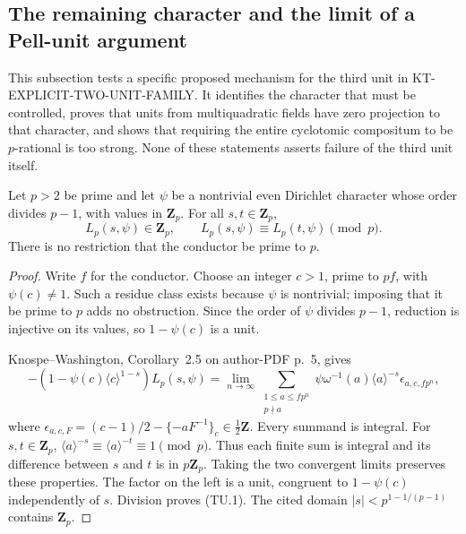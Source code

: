 \subsection{The remaining character and the limit of a Pell-unit argument}
\label{sec:kt-third-unit-character}

This subsection tests a specific proposed mechanism for the third unit in
KT-EXPLICIT-TWO-UNIT-FAMILY.  It identifies the character that must be
controlled, proves that units from multiquadratic fields have zero
projection to that character, and shows that requiring the entire
cyclotomic compositum to be $p$-rational is too strong.  None of these
statements asserts failure of the third unit itself.

\begin{lemma}
Let $p>2$ be prime and let $\psi$ be a nontrivial even Dirichlet
character whose order divides $p-1$, with values in $\mathbf Z_p$.
For all $s,t\in\mathbf Z_p$,
\[
 L_p(s,\psi)\in\mathbf Z_p,\qquad
 L_p(s,\psi)\equiv L_p(t,\psi)\pmod p.                 \tag{TU.1}
\]
There is no restriction that the conductor be prime to $p$.
\end{lemma}
\begin{proof}
Write $f$ for the conductor.  Choose an integer $c>1$, prime to $pf$,
with $\psi(c)\ne1$.  Such a residue class exists because $\psi$ is
nontrivial; imposing that it be prime to $p$ adds no obstruction.
Since the order of $\psi$ divides $p-1$, reduction is injective on its
values, so $1-\psi(c)$ is a unit.

Knospe--Washington, Corollary~2.5 on author-PDF p.~5, gives
\[
 -(1-\psi(c)\langle c\rangle^{1-s})L_p(s,\psi)
 =\lim_{n\to\infty}\sum_{\substack{1\le a\le fp^n\\p\nmid a}}
     \psi\omega^{-1}(a)\langle a\rangle^{-s}
     \epsilon_{a,c,fp^n},                                  \tag{TU.2}
\]
where
$\epsilon_{a,c,F}=(c-1)/2-\{-aF^{-1}\}_c\in\tfrac12\mathbf Z$.
Every summand is integral.  For $s,t\in\mathbf Z_p$,
$\langle a\rangle^{-s}\equiv\langle a\rangle^{-t}\equiv1\pmod p$.
Thus each finite sum is integral and its difference between $s$ and
$t$ is in $p\mathbf Z_p$.  Taking the two convergent limits preserves
these properties.  The factor on the left is a unit, congruent to
$1-\psi(c)$ independently of $s$.  Division proves (TU.1).
The cited domain $|s|<p^{1-1/(p-1)}$ contains $\mathbf Z_p$.
\end{proof}

